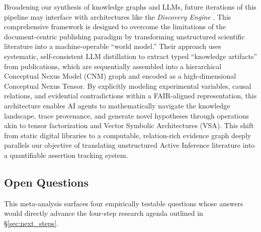 \documentclass[
  english,
]{article}
\begin{document}
Broadening our synthesis of knowledge graphs and LLMs, future iterations
of this pipeline may interface with architectures like the
\emph{Discovery Engine} \citep{baulin2025discovery}. This comprehensive
framework is designed to overcome the limitations of the
document-centric publishing paradigm by transforming unstructured
scientific literature into a machine-operable ``world model.'' Their
approach uses systematic, self-consistent LLM distillation to extract
typed ``knowledge artifacts'' from publications, which are sequentially
assembled into a hierarchical Conceptual Nexus Model (CNM) graph and
encoded as a high-dimensional Conceptual Nexus Tensor. By explicitly
modeling experimental variables, causal relations, and evidential
contradictions within a FAIR-aligned representation, this architecture
enables AI agents to mathematically navigate the knowledge landscape,
trace provenance, and generate novel hypotheses through operations akin
to tensor factorization and Vector Symbolic Architectures (VSA). This
shift from static digital libraries to a computable, relation-rich
evidence graph deeply parallels our objective of translating
unstructured Active Inference literature into a quantifiable assertion
tracking system.

\subsection{Open Questions}\label{open-questions}

This meta-analysis surfaces four empirically testable questions whose
answers would directly advance the four-step research agenda outlined in
\S\ref{sec:next_steps}.
\end{document}
